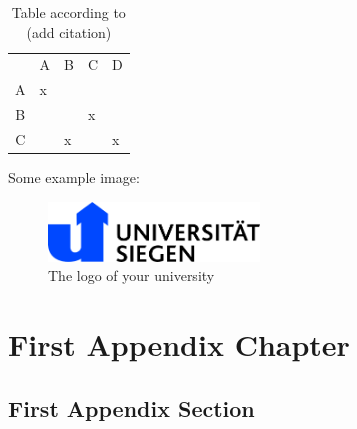 \documentclass[
thesis%
]{csthes}
\begin{document}
\begin{table}[hb!]
\centering
\caption{Table according to (add citation)} 
\begin{tabular}{|c|l|l|l|l|}
\hline
\rowcolor[HTML]{C0C0C0} 
\multicolumn{1}{|l|}{\cellcolor[HTML]{C0C0C0}{\color[HTML]{000000} Some Table}} & {\color[HTML]{000000} A} & {\color[HTML]{000000} B} & {\color[HTML]{000000} C} & {\color[HTML]{000000} D} \\ 
A                                                                               & x                        &                          &                          &                          \\ 
B                                                                               &                          &                          & x                        &                          \\ 
C                                                                               &                          & x                        &                          & x                        \\ 
\end{tabular}

\end{table}

Some example image:
\begin{figure}[hb!]
\centering
  \includegraphics[width=0.5\textwidth]{images/uni_siegen_logo}
    \caption{The logo of your university}
\end{figure}


\appendix
\chapter{First Appendix Chapter}
\section{First Appendix Section}
\end{document}
